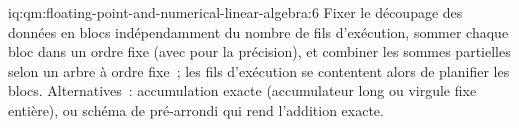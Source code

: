 \begin{solution}{iq:qm:floating-point-and-numerical-linear-algebra:6}
Fixer le découpage des données en blocs indépendamment du nombre de fils d'exécution, sommer chaque bloc dans un ordre fixe (avec  pour la précision), et combiner les sommes partielles selon un arbre
à ordre fixe~; les fils d'exécution se contentent alors de planifier les blocs. Alternatives~: accumulation exacte (accumulateur long ou virgule fixe entière), ou schéma de pré-arrondi qui rend l'addition exacte.
\end{solution}
